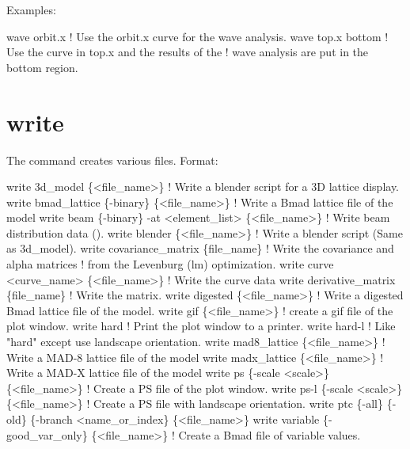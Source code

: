 {{{{{{Examples:
\begin{example}
  wave orbit.x      ! Use the orbit.x curve for the wave analysis.
  wave top.x bottom ! Use the curve in top.x and the results of the 
                    !  wave analysis are put in the bottom region.
\end{example}

\section{write}
\label{s:write}

The  command creates various files.
Format:
\begin{example}
  write 3d_model \{<file_name>\}           ! Write a blender script for a 3D lattice display.
  write bmad_lattice \{-binary\} \{<file_name>\} 
                                         ! Write a Bmad lattice file of the model
  write beam \{-binary\} -at <element_list> \{<file_name>\} 
                                         ! Write beam distribution data ().
  write blender \{<file_name>\}            ! Write a blender script (Same as 3d_model).
  write covariance_matrix \{file_name\}    ! Write the covariance and alpha matrices 
                                         !   from the Levenburg (lm) optimization.
  write curve <curve_name> \{<file_name>\} ! Write the curve data
  write derivative_matrix \{file_name\}    ! Write the  matrix.
  write digested \{<file_name>\}      ! Write a digested Bmad lattice file of the model.
  write gif \{<file_name>\}           ! create a gif file of the plot window.
  write hard                        ! Print the plot window to a printer.
  write hard-l                      ! Like "hard" except use landscape orientation. 
  write mad8_lattice \{<file_name>\}  ! Write a MAD-8 lattice file of the model
  write madx_lattice \{<file_name>\}  ! Write a MAD-X lattice file of the model
  write ps \{-scale <scale>\} \{<file_name>\}      
                                    ! Create a PS file of the plot window.
  write ps-l \{-scale <scale>\} \{<file_name>\}    
                                    ! Create a PS file with landscape orientation.
  write ptc \{-all\} \{-old\} \{-branch <name_or_index\} \{<file_name>\}
  write variable \{-good_var_only\} \{<file_name>\} 
                                    ! Create a Bmad file of variable values.
\end{example}

}}}}}}
